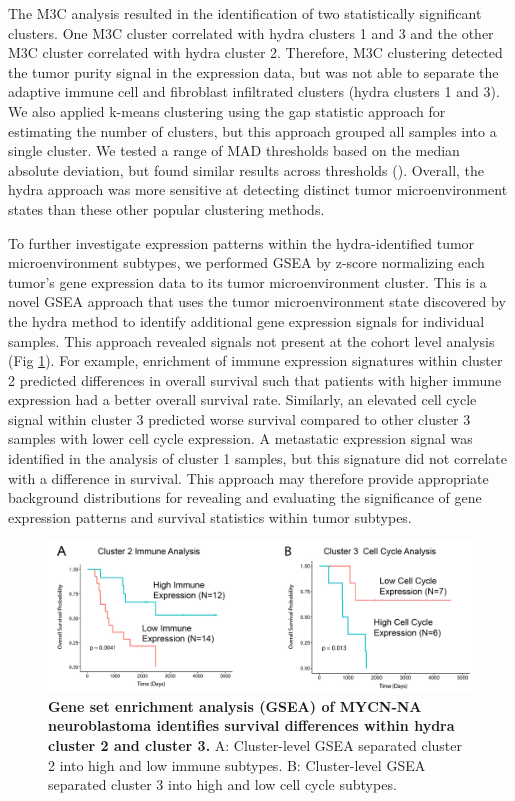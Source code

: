 \documentclass[10pt,letterpaper]{article}
\begin{document}
The M3C analysis resulted in the identification of two statistically significant clusters. One M3C cluster correlated with hydra clusters 1 and 3 and the other M3C cluster correlated with hydra cluster 2. Therefore, M3C clustering detected the tumor purity signal in the expression data, but was not able to separate the adaptive immune cell and fibroblast infiltrated clusters (hydra clusters 1 and 3). We also applied k-means clustering using the gap statistic approach \cite{tibshirani2001estimating,maechler2012cluster} for estimating the number of clusters, but this approach grouped all samples into a single cluster. We tested a range of MAD thresholds based on the median absolute deviation, but found similar results across thresholds (). Overall, the hydra approach was more sensitive at detecting distinct tumor microenvironment states than these other popular clustering methods.

To further investigate expression patterns within the hydra-identified tumor microenvironment subtypes, we performed GSEA by z-score normalizing each tumor’s gene expression data to its tumor microenvironment cluster. This is a novel GSEA approach that uses the tumor microenvironment state discovered by the hydra method to identify additional gene expression signals for individual samples. This approach revealed signals not present at the cohort level analysis (Fig \ref{subcluster}). For example, enrichment of immune expression signatures within cluster 2 predicted differences in overall survival such that patients with higher immune expression had a better overall survival rate. Similarly, an elevated cell cycle signal within cluster 3 predicted worse survival compared to other cluster 3 samples with lower cell cycle expression. A metastatic expression signal was identified in the analysis of cluster 1 samples, but this signature did not correlate with a difference in survival. This approach may therefore provide appropriate background distributions for revealing and evaluating the significance of gene expression patterns and survival statistics within tumor subtypes.


\begin{figure}[!h]
	\includegraphics[width=\textwidth]{img/PNG/SubCluster-Survival-V1-2x}
	\caption{{\bf Gene set enrichment analysis (GSEA) of MYCN-NA neuroblastoma identifies survival differences within hydra cluster 2 and cluster 3.}
		A: Cluster-level GSEA separated cluster 2 into high and low immune subtypes. B: Cluster-level GSEA separated cluster 3 into high and low cell cycle subtypes.}
	\label{subcluster}
\end{figure}
\end{document}
